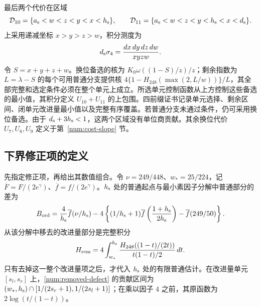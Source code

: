 最后两个代价在区域
\[
 \mathcal D_{10}=\{{a_{\rm s}}<w<z<y<x<{h_{\rm s}}\},\qquad
 \mathcal D_{11}=\{{a_{\rm s}}<w<z<y<{h_{\rm s}}<x<{d_{\rm s}}\}.
\]
上采用递减坐标 $x>y>z>w$，积分测度为
\[
 {d_{\rm s}}\sigma_4=\frac{dx\,dy\,dz\,dw}{xyzw}.
\]
令 $S=x+y+z+w$。换位备选的核为 $K_0\omega((1-S)/z)/z$；剩余指数为 $L=\lambda-S$ 的每个可用普通分支提供核 $4\{1-H_{248}(\max(2,L/w))\}/L$，其全部完整和选定条件必须在整个单元上成立。所选单元控制函数从上方控制这些备选的最小值，其积分定义 $U_{10}+U_{11}$ 的上包围。四前缀证书记录单元选择、剩余区间、闭单元改进量最小值以及完整有序覆盖。若普通分支未通过条件，仍可采用换位备选。由于 ${d_{\rm s}}+3{h_{\rm s}}<1$，这两个区域没有单位商贡献。其余换位代价 $U_7,U_8,U_9$ 定义于第~\ref{num:cost-slope} 节。

\subsection{下界修正项的定义}
\label{num:lower-definitions}
先指定修正项，再给出其数值组合。令 $\nu=249/448$、$w_*=25/224$，记 $\overline F=F/(2e^\gamma)$、$\overline f=f/(2e^\gamma)$。${h_{\rm s}}$ 处的普通起点与最小素因子分解中普通部分的差为
\begin{equation}
 B_{\rm ord}=\frac4{h_{\rm s}}\overline f(\nu/{h_{\rm s}})
 -4\left\{(1/{h_{\rm s}}+1)\overline f\left(\frac{1+{h_{\rm s}}}{2{h_{\rm s}}}\right)
                   -\overline f(249/50)\right\}.
 \label{num:ordinary-start-difference}
\end{equation}
从该分解中移去的改进量部分是完整积分
\begin{equation}
 H_{\rm rem}=4\int_{w_*}^{{h_{\rm s}}}
   \frac{H_{248}((1-t)/(2t))}{t(1-t)/2}\,dt.
 \label{num:removed-defect}
\end{equation}
只有去掉这一整个改进量项之后，才代入 ${h_{\rm s}}$ 处的有限普通估计。在改进量单元 $[s_l,s_r]$ 上，\eqref{num:removed-defect} 的贡献区间为 $(w_*,{h_{\rm s}})\cap[1/(2s_r+1),1/(2s_l+1)]$；在乘以因子 $4$ 之前，其原函数为 $2\log(t/(1-t))$。


